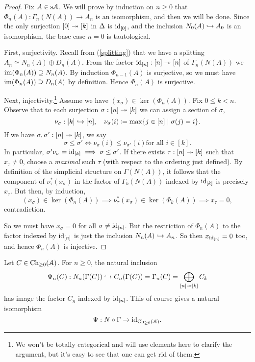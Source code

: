 \begin{proof}
  Fix $A \in \mathrm{s}\mathcal{A}$. We will prove by induction on $n \ge 0$ that
  $\Phi_n(A) : \Gamma_n(N(A)) \to A_n$ is an isomorphism, and then we
  will be done. Since the only surjection $[0] \twoheadrightarrow [k]$ in
  $\Delta$ is $\mathrm{id}_{[0]}$, and the inclusion $N_0(A) \hookrightarrow A_0$ is an
  isomorphism, the base case $n=0$ is tautological.

  \medskip
  First, surjectivity. Recall from (\ref{splitting}) that we have a
  splitting $A_n \simeq N_n(A) \oplus D_n(A)$. From the factor
  $\mathrm{id}_{[n]} : [n] \twoheadrightarrow [n]$ of $\Gamma_n(N(A))$ we $\operatorname{im}(\Phi_n(A))
  \supseteq N_n(A)$. By induction $\Phi_{n-1}(A)$ is surjective, so we
  must have $\operatorname{im}(\Phi_n(A)) \supseteq D_n(A)$ by definition. Hence
  $\Phi_n(A)$ is surjective.

  \medskip
  Next, injectivity.\footnote{We won't be totally categorical and will
    use elements here to clarify the argument, but it's easy to see
    that one can get rid of them.} Assume we have $(x_\sigma) \in
  \ker(\Phi_n(A))$.  Fix $0 \le k < n$. Observe that to each
  surjection $\sigma : [n] \twoheadrightarrow [k]$ we can assign a section of
  $\sigma$,
  \[
  \nu_\sigma : [k] \hookrightarrow [n], \quad \nu_\sigma(i) \coloneqq \max\{j \in
     [n] \mid \sigma(j) = i\}.
  \]
  If we have $\sigma, \sigma' : [n] \twoheadrightarrow [k]$, we say
  \[
  \sigma \le \sigma' \iff \nu_\sigma(i) \le \nu_{\sigma'}(i) \text{
    for all } i \in [k].
  \]
  In particular, $\sigma'\nu_\sigma = \mathrm{id}_{[k]} \implies \sigma \le
  \sigma'$. If there exists $\tau : [n] \twoheadrightarrow [k]$ such that $x_\tau
  \ne 0$, choose a \textit{maximal} such $\tau$ (with respect to the
  ordering just defined). By definition of the simplicial structure on
  $\Gamma(N(A))$, it follows that the component of
  $\nu_\tau^*(x_\sigma)$ in the factor of $\Gamma_k(N(A))$ indexed by
  $\mathrm{id}_{[k]}$ is precisely $x_\tau$. But then, by induction,
  \[
  (x_\sigma) \in \ker(\Phi_n(A)) \implies \nu_\tau^*(x_\sigma) \in
  \ker(\Phi_k(A)) \implies x_\tau = 0,
  \]
  contradiction.

  \medskip
  So we must have $x_\sigma = 0$ for all $\sigma \ne \mathrm{id}_{[n]}$. But
  the restriction of $\Phi_n(A)$ to the factor indexed by $\mathrm{id}_{[n]}$
  is just the inclusion $N_n(A) \hookrightarrow A_n$. So then $x_{\mathrm{id}_{[n]}} = 0$
  too, and hence $\Phi_n(A)$ is injective.
\end{proof}

\begin{lemma}
  \label{n-gamma}
  Let $C \in \mathrm{Ch}_{\ge 0}(\mathcal{A})$. For $n \ge 0$, the natural inclusion
  \[
  \Psi_n(C) : N_n(\Gamma(C)) \hookrightarrow C_n(\Gamma(C)) = \Gamma_n(C) =
  \bigoplus_{[n] \twoheadrightarrow [k]} C_k
  \]
  has image the factor $C_n$ indexed by $\mathrm{id}_{[n]}$. This of course
  gives a natural isomorphism
  \[
  \Psi : N \circ \Gamma \to \mathrm{id}_{\mathrm{Ch}_{\ge 0}(\mathcal{A})}.
  \]
\end{lemma}

